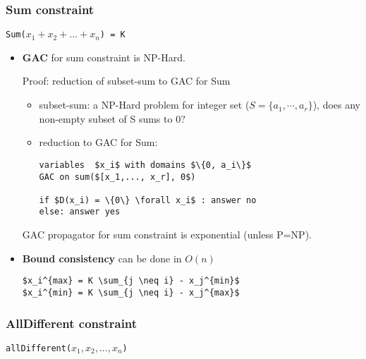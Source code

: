 \subsubsection{Sum constraint}
\begin{center}
    \texttt{Sum($x_1 + x_2 + ... + x_n$) = K}
\end{center}

\begin{itemize}
    \item \textbf{GAC} for sum constraint is NP-Hard.

        Proof: reduction of subset-sum to GAC for Sum
        \begin{itemize}
            \item subset-sum: a NP-Hard problem for integer set ($S=\{a_1,\cdots, a_r\}$),
                does any non-empty subset of S sums to 0?

            \item reduction to GAC for Sum:
                \begin{lstlisting}[mathescape]
variables  $x_i$ with domains $\{0, a_i\}$
GAC on sum($[x_1,..., x_r], 0$)

if $D(x_i) = \{0\} \forall x_i$ : answer no
else: answer yes
                \end{lstlisting}
        \end{itemize}

       GAC propagator for sum constraint is exponential (unless P=NP).

   \item \textbf{Bound consistency} can be done in $O(n)$

       \begin{lstlisting}[mathescape]
$x_i^{max} = K \sum_{j \neq i} - x_j^{min}$
$x_i^{min} = K \sum_{j \neq i} - x_j^{max}$
       \end{lstlisting}
\end{itemize}

\subsubsection{AllDifferent constraint}
\begin{center}
    \texttt{allDifferent($x_1, x_2,..., x_n$)}
\end{center}

